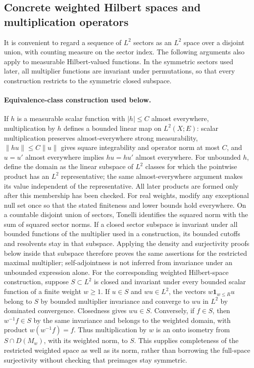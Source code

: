 \documentclass[11pt,a4paper]{article}
\theoremstyle{definition}
\theoremstyle{remark}
\begin{document}
\subsection{Concrete weighted Hilbert spaces and multiplication operators}

It is convenient to regard a sequence of $L^2$ sectors as an $L^2$ space over
a disjoint union, with counting measure on the sector index. The following
arguments also apply to measurable Hilbert-valued functions. In the symmetric
sectors used later, all multiplier functions are invariant under permutations,
so that every construction restricts to the symmetric closed subspace.

\paragraph{Equivalence-class construction used below.}
If $h$ is a measurable scalar function with $|h|\leq C$ almost
everywhere, multiplication by $h$ defines a bounded linear map on
$L^2(X;E)$: scalar multiplication preserves almost-everywhere strong
measurability, $\|hu\|\leq C\|u\|$ gives square integrability and
operator norm at most $C$, and $u=u'$ almost everywhere implies
$hu=hu'$ almost everywhere. For unbounded $h$, define the domain as
the linear subspace of $L^2$ classes for which the pointwise product
has an $L^2$ representative; the same almost-everywhere argument makes
its value independent of the representative. All later products are
formed only after this membership has been checked. For real weights,
modify any exceptional null set once so that the stated finiteness and
lower bounds hold everywhere. On a countable disjoint union of sectors,
Tonelli identifies the squared norm with the sum of squared sector norms.
If a closed sector subspace is invariant under all bounded functions of
the multiplier used in a construction, its bounded cutoffs and
resolvents stay in that subspace. Applying the density and surjectivity
proofs below inside that subspace therefore proves the same assertions
for the restricted maximal multiplier; self-adjointness is not inferred
from invariance under an unbounded expression alone.
For the corresponding weighted Hilbert-space construction, suppose
$S\subset L^2$ is closed and invariant under every bounded scalar
function of a finite weight $w\geq1$. If $u\in S$ and $wu\in L^2$,
the vectors $w\mathbf1_{w\leq R}u$ belong to $S$ by bounded
multiplier invariance and converge to $wu$ in $L^2$ by dominated
convergence. Closedness gives $wu\in S$. Conversely, if $f\in S$,
then $w^{-1}f\in S$ by the same invariance and belongs to the
weighted domain, with product $w(w^{-1}f)=f$. Thus multiplication
by $w$ is an onto isometry from $S\cap D(M_w)$, with its weighted
norm, to $S$. This supplies completeness of the restricted weighted
space as well as its norm, rather than borrowing the full-space
surjectivity without checking that preimages stay symmetric.
\end{document}
